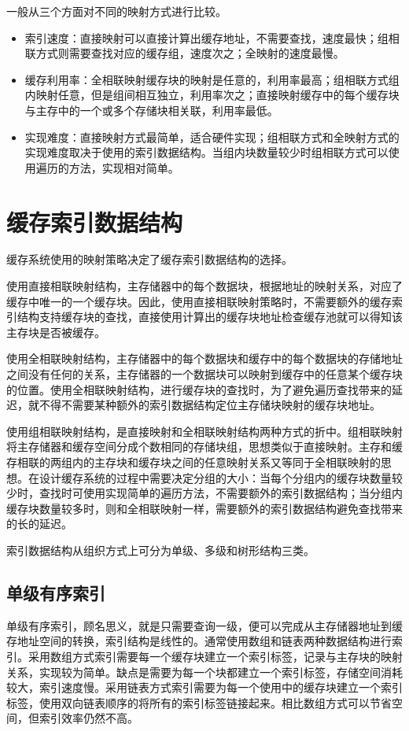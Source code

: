 一般从三个方面对不同的映射方式进行比较。
\begin{itemize}
\item 索引速度：直接映射可以直接计算出缓存地址，不需要查找，速度最快；组相联方式则需要查找对应的缓存组，速度次之；全映射的速度最慢。
\item
缓存利用率：全相联映射缓存块的映射是任意的，利用率最高；组相联方式组内映射任意，但是组间相互独立，利用率次之；直接映射缓存中的每个缓存块与主存中的一个或多个存储块相关联，利用率最低。
\item
实现难度：直接映射方式最简单，适合硬件实现；组相联方式和全映射方式的实现难度取决于使用的索引数据结构。当组内块数量较少时组相联方式可以使用遍历的方法，实现相对简单。
\end{itemize}

\section{缓存索引数据结构}
\label{sec:cache_indexing}

缓存系统使用的映射策略决定了缓存索引数据结构的选择。

使用直接相联映射结构，主存储器中的每个数据块，根据地址的映射关系，对应了缓存中唯一的一个缓存块。因此，使用直接相联映射策略时，不需要额外的缓存索引结构支持缓存块的查找，直接使用计算出的缓存块地址检查缓存池就可以得知该主存块是否被缓存。

使用全相联映射结构，主存储器中的每个数据块和缓存中的每个数据块的存储地址之间没有任何的关系，主存储器的一个数据块可以映射到缓存中的任意某个缓存块的位置。使用全相联映射结构，进行缓存块的查找时，为了避免遍历查找带来的延迟，就不得不需要某种额外的索引数据结构定位主存储块映射的缓存块地址。

使用组相联映射结构，是直接映射和全相联映射结构两种方式的折中。组相联映射将主存储器和缓存空间分成个数相同的存储块组，思想类似于直接映射。主存和缓存相联的两组内的主存块和缓存块之间的任意映射关系又等同于全相联映射的思想。在设计缓存系统的过程中需要决定分组的大小：当每个分组内的缓存块数量较少时，查找时可使用实现简单的遍历方法，不需要额外的索引数据结构；当分组内缓存块数量较多时，则和全相联映射一样，需要额外的索引数据结构避免查找带来的长的延迟。

索引数据结构从组织方式上可分为单级、多级和树形结构三类。

\subsection{单级有序索引}
单级有序索引，顾名思义，就是只需要查询一级，便可以完成从主存储器地址到缓存地址空间的转换，索引结构是线性的。通常使用数组和链表两种数据结构进行索引。采用数组方式索引需要每一个缓存块建立一个索引标签，记录与主存块的映射关系，实现较为简单。缺点是需要为每一个块都建立一个索引标签，存储空间消耗较大，索引速度慢。采用链表方式索引需要为每一个使用中的缓存块建立一个索引标签，使用双向链表顺序的将所有的索引标签链接起来。相比数组方式可以节省空间，但索引效率仍然不高。

